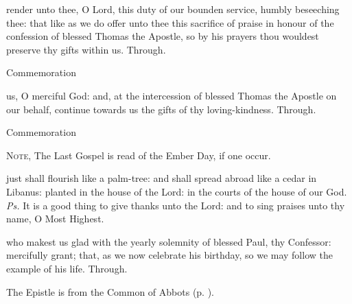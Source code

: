 \secret

\vspace{-0.25\baselineskip}

 render unto thee, O Lord, this duty of our bounden service, humbly beseeching thee: that like as we do offer unto thee this sacrifice of praise in honour of the confession of blessed Thomas the Apostle, so by his prayers thou wouldest preserve thy gifts within us. Through.
\begin{rubric}
    Commemoration %
\end{rubric}


\vspace{-0.5\baselineskip}

\postcommunion

\vspace{-0.25\baselineskip}

 us, O merciful God: and, at the intercession of blessed Thomas the Apostle on our behalf, continue towards us the gifts of thy loving-kindness. Through.
\begin{rubric}
    Commemoration %
\end{rubric}

\begin{rubric}
   \textsc{Note,} The Last Gospel is read of the Ember Day, if one occur.%
\end{rubric}



\introit
{} just shall flourish like a palm-tree: and shall spread abroad like a cedar in Libanus: planted in the house of the Lord: in the courts of the house of our God. \textit{Ps.} It is a good thing to give thanks unto the Lord: and to sing praises unto thy name, O Most Highest.

\collect
{} who makest us glad with the yearly solemnity of blessed Paul, thy Confessor: mercifully grant; that, as we now celebrate his birthday, so we may follow the example of his life. Through.

\begin{rubric}
	The Epistle is from the Common of Abbots (p. \pageref{CommonAbbotsEpistle}).
\end{rubric}

